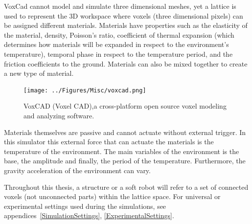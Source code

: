 VoxCad cannot model and simulate three dimensional meshes, yet a lattice is used to represent the 3D workspace where voxels (three dimensional pixels) can be assigned different materials. Materials have properties such as the elasticity of the material, density, Poisson's ratio, coefficient of thermal expansion (which determines how materials will be expanded in respect to the environment's temperature), temporal phase in respect to the temperature period, and the friction coefficients to the ground. Materials can also be mixed together to create a new type of material.

\begin{figure}[t!]
\centering
\texttt{[image: ../Figures/Misc/voxcad.png]}
\caption{VoxCAD (Voxel CAD),a cross-platform open source voxel modeling and analyzing software.}
\label{fig:VoxCAD}
\end{figure}

Materials themselves are passive and cannot actuate without external trigger. In this simulator this external force that can actuate the materials is the temperature of the environment. The main variables of the environment is the base, the amplitude and finally, the period of the temperature. Furthermore, the gravity acceleration of the environment can vary.

Throughout this thesis, a structure or a soft robot will refer to a set of connected voxels (not unconnected parts) within the lattice space. For universal or experimental settings used during the simulations, see appendices~\ref{SimulationSettings}, \ref{ExperimentalSettings}.


